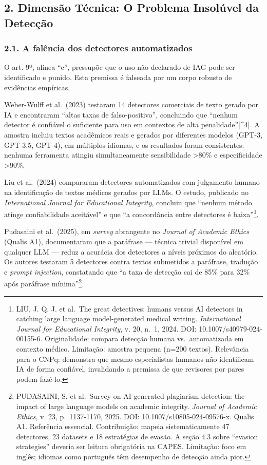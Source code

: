 \documentclass[
  12pt,
  a4paper,
  brazil
]{article}
\begin{document}
\subsection{2. Dimensão Técnica: O Problema Insolúvel da
Detecção}\label{dimensuxe3o-tuxe9cnica-o-problema-insoluxfavel-da-detecuxe7uxe3o}

\subsubsection{2.1. A falência dos detectores
automatizados}\label{a-faluxeancia-dos-detectores-automatizados}

O art. 9º, alínea ``c'', pressupõe que o uso não declarado de IAG pode
ser identificado e punido. Esta premissa é falseada por um corpo robusto
de evidências empíricas.

Weber-Wulff et al.~(2023) testaram 14 detectores comerciais de texto
gerado por IA e encontraram ``altas taxas de falso-positivo'',
concluindo que ``nenhum detector é confiável o suficiente para uso em
contextos de alta penalidade''{[}\^{}4{]}. A amostra incluiu textos
acadêmicos reais e gerados por diferentes modelos (GPT-3, GPT-3.5,
GPT-4), em múltiplos idiomas, e os resultados foram consistentes:
nenhuma ferramenta atingiu simultaneamente sensibilidade
\textgreater80\% e especificidade \textgreater90\%.

Liu et al.~(2024) compararam detectores automatizados com julgamento
humano na identificação de textos médicos gerados por LLMs. O estudo,
publicado no \emph{International Journal for Educational Integrity},
concluiu que ``nenhum método atinge confiabilidade aceitável'' e que ``a
concordância entre detectores é baixa''\footnote{LIU, J. Q. J. et
  al.~The great detectives: humans versus AI detectors in catching large
  language model-generated medical writing. \emph{International Journal
  for Educational Integrity}, v. 20, n.~1, 2024. DOI:
  10.1007/s40979-024-00155-6. Originalidade: compara detecção humana
  vs.~automatizada em contexto médico. Limitação: amostra pequena (n=200
  textos). Relevância para o CNPq: demonstra que mesmo especialistas
  humanos não identificam IA de forma confiável, invalidando a premissa
  de que revisores por pares podem fazê-lo.}.

Pudasaini et al.~(2025), em \emph{survey} abrangente no \emph{Journal of
Academic Ethics} (Qualis A1), documentaram que a paráfrase --- técnica
trivial disponível em qualquer LLM --- reduz a acurácia dos detectores a
níveis próximos do aleatório. Os autores testaram 5 detectores contra
textos submetidos a paráfrase, tradução e \emph{prompt injection},
constatando que ``a taxa de detecção cai de 85\% para 32\% após
paráfrase mínima''\footnote{PUDASAINI, S. et al.~Survey on AI-generated
  plagiarism detection: the impact of large language models on academic
  integrity. \emph{Journal of Academic Ethics}, v. 23, p.~1137-1170,
  2025. DOI: 10.1007/s10805-024-09576-x. Qualis A1. Referência
  essencial. Contribuição: mapeia sistematicamente 47 detectores, 23
  datasets e 18 estratégias de evasão. A seção 4.3 sobre ``evasion
  strategies'' deveria ser leitura obrigatória na CAPES. Limitação: foco
  em inglês; idiomas como português têm desempenho de detecção ainda
  pior.}.
\end{document}
